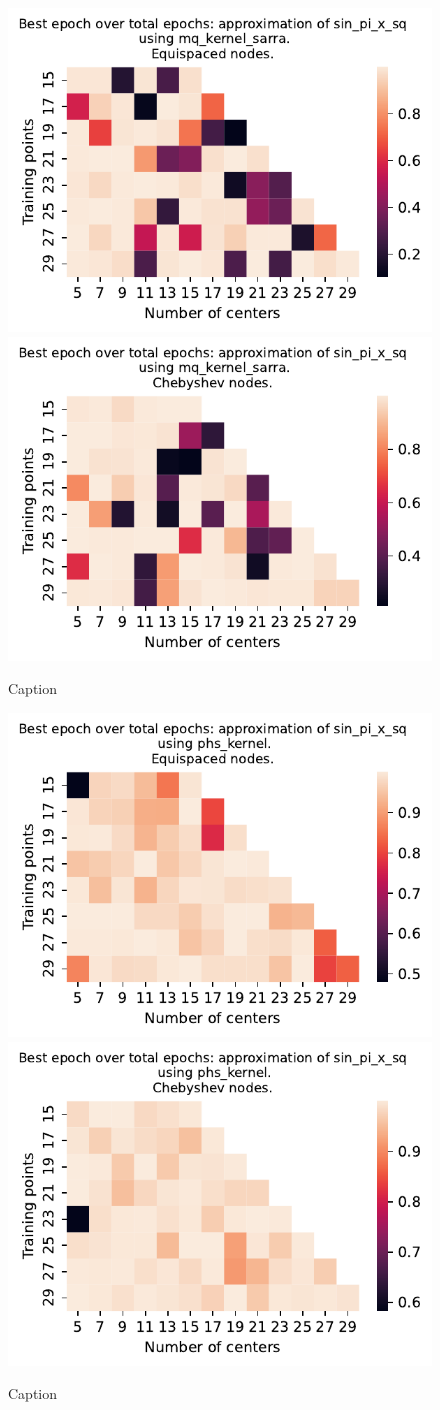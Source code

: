 \documentclass[12pt]{report} %
\begin{document}
\begin{figure}[ht]
    \centering
    
    \includegraphics[width=.49\textwidth]{imagenes/experiments/1d/variational_epochs/sin_pi_x_sq-Kmq_kernel_sarra-Equi-epochs.pdf}
    \includegraphics[width=.49\textwidth]{imagenes/experiments/1d/variational_epochs/sin_pi_x_sq-Kmq_kernel_sarra-Cheb-epochs.pdf}
    \caption{Caption}
    \label{fig:epochs-sin-pi-x-sq-sarra}
\end{figure}

\begin{figure}[ht]
    \centering
    
    \includegraphics[width=.49\textwidth]{imagenes/experiments/1d/variational_epochs/sin_pi_x_sq-Kphs_kernel-Equi-epochs.pdf}
    \includegraphics[width=.49\textwidth]{imagenes/experiments/1d/variational_epochs/sin_pi_x_sq-Kphs_kernel-Cheb-epochs.pdf}
    \caption{Caption}
    \label{fig:epochs-sin-pi-x-sq-phs}
\end{figure}
\end{document}

